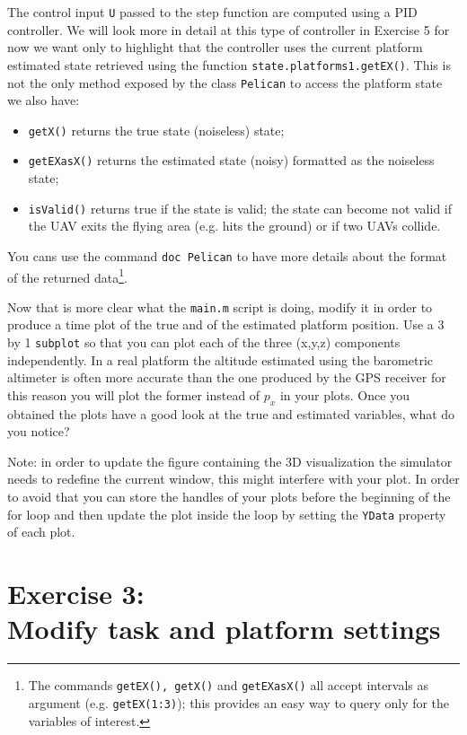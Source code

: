\documentclass[a4paper,11pt]{article}
\begin{document}
The control input \texttt{U} passed to the step function are computed using a PID controller. We will look more in detail at this type of controller in Exercise 5 for now we want only to highlight that the controller uses the current platform estimated state retrieved using the function \texttt{state.platforms{1}.getEX()}.
This is not the only method exposed by the class \texttt{Pelican} to access the platform state we also have:
\begin{itemize}
 \item \texttt{getX()} returns the true state (noiseless) state;
 \item \texttt{getEXasX()} returns the estimated state (noisy) formatted as the noiseless state;
 \item \texttt{isValid()} returns true if the state is valid; the state can become not valid if the UAV exits the flying area (e.g. hits the ground) or if two UAVs collide.
\end{itemize}
You cans use the command \texttt{doc Pelican} to have more details about the format of the returned data\footnote{The commands \texttt{getEX(), getX()} and \texttt{getEXasX()} all accept intervals as argument (e.g. \texttt{getEX(1:3)}); this provides an easy way to query only for the variables of interest.}.
 
Now that is more clear what the \texttt{main.m} script is doing, modify it in order to produce a time plot of the true and of the estimated platform position. Use a 3 by 1 \texttt{subplot} so that you can plot each of the three (x,y,z) components independently.   
In a real platform the altitude estimated using the barometric altimeter is often more accurate than the one produced by the GPS receiver for this reason you will plot the former instead of $p_x$ in your plots.
Once you obtained the plots have a good look at the true and estimated variables, what do you notice?

\textsf{Note:}
in order to update the figure containing the 3D visualization the simulator needs to redefine the current window, this might interfere with your plot.
In order to avoid that you can store the handles of your plots before the beginning of the for loop and then update the plot inside the loop by setting the \texttt{YData} property of each plot.

\section*{Exercise 3:\\Modify task and platform settings}
\end{document}
